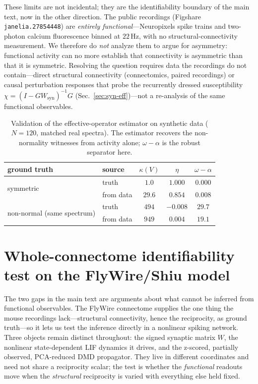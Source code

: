 \documentclass[11pt]{article}
\begin{document}
These limits are not incidental; they are the identifiability boundary of the
main text, now in the other direction. The public recordings
(Figshare \texttt{janelia.27854448}) are \emph{entirely functional}---Neuropixels
spike trains and two-photon calcium fluorescence binned at $22$\,Hz, with no
structural-connectivity measurement. We therefore do \emph{not} analyze them to
argue for asymmetry: functional activity can no more establish that connectivity
is asymmetric than that it is symmetric. Resolving the question requires data the
recordings do not contain---direct structural connectivity (connectomics, paired
recordings) or causal perturbation responses that probe the recurrently dressed
susceptibility $\chi=(I-GW_{\mathrm{syn}})^{-1}G$ (Sec.~\ref{sec:syn-eff})---not a
re-analysis of the same functional observables.

\begin{table}[h]
\centering
\caption{Validation of the effective-operator estimator on synthetic data
($N=120$, matched real spectra). The estimator recovers the non-normality
witnesses from activity alone; $\omega-\alpha$ is the robust separator here.}
\label{tab:dataest}
\begin{tabular}{llccc}
\toprule
ground truth & source & $\kappa(V)$ & $\eta$ & $\omega-\alpha$\\
\midrule
\multirow{2}{*}{symmetric} & truth & $1.0$ & $1.000$ & $0.000$\\
 & from data & $29.6$ & $0.854$ & $0.008$\\
\multirow{2}{*}{non-normal (same spectrum)} & truth & $494$ & $-0.008$ & $29.7$\\
 & from data & $949$ & $0.004$ & $19.1$\\
\bottomrule
\end{tabular}
\end{table}

\section{Whole-connectome identifiability test on the FlyWire/Shiu model}
\label{sec:flywire}
The two gaps in the main text are arguments about what cannot be inferred from
functional observables. The FlyWire connectome supplies the one thing the mouse
recordings lack---structural connectivity, hence the reciprocity, as ground
truth---so it lets us test the inference directly in a nonlinear spiking network.
Three objects remain distinct throughout: the signed synaptic matrix $W$, the
nonlinear state-dependent LIF dynamics it drives, and the z-scored, partially
observed, PCA-reduced DMD propagator. They live in different coordinates and need
not share a reciprocity scalar; the test is whether the \emph{functional}
readouts move when the \emph{structural} reciprocity is varied with everything
else held fixed.
\end{document}
